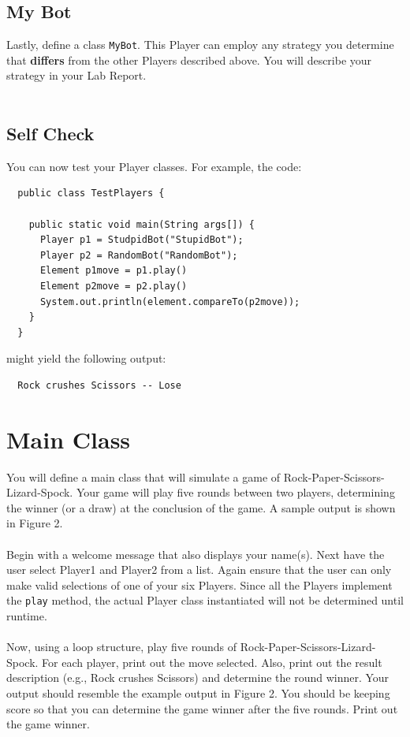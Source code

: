 \documentclass{article}
\begin{document}
\subsection*{My Bot}
Lastly, define a class \verb|MyBot|. This Player can employ any strategy you determine that \textbf{differs} from the other Players described above. You will describe your strategy in your Lab Report.
\\\\
\begin{tcolorbox}
 \section*{Self Check}
 You can now test your Player classes. For example, the code:
 
 \begin{lstlisting}
  public class TestPlayers {
  
    public static void main(String args[]) {
      Player p1 = StudpidBot("StupidBot");
      Player p2 = RandomBot("RandomBot");
      Element p1move = p1.play()
      Element p2move = p2.play()
      System.out.println(element.compareTo(p2move));
    }
  }
 \end{lstlisting}

 might yield the following output:
 
 \begin{verbatim}
  Rock crushes Scissors -- Lose
 \end{verbatim}

\end{tcolorbox}

\section*{Main Class}
You will define a main class that will simulate a game of Rock-Paper-Scissors-Lizard-Spock. Your game will play five rounds between two players, determining the winner (or a draw) at the conclusion of the game. A sample output is shown in Figure 2.
\\\\
\noindent Begin with a welcome message that also displays your name(s). Next have the user select Player1 and Player2 from a list. Again ensure that the user can only make valid selections of one of your six Players. Since all the Players implement the \verb|play| method, the actual Player class instantiated will not be determined until runtime.
\\\\
\noindent Now, using a loop structure, play five rounds of Rock-Paper-Scissors-Lizard-Spock. For each player, print out the move selected. Also, print out the result description (e.g., Rock crushes Scissors) and determine the round winner. Your output should resemble the example output in Figure 2. You should be keeping score so that you can determine the game winner after the five rounds. Print out the game winner.
\end{document}
